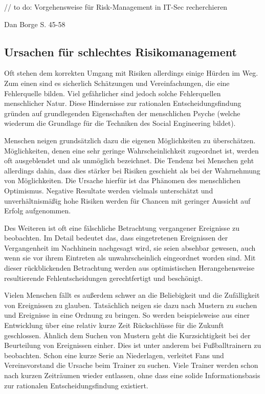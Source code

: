 // to do: Vorgehensweise für Risk-Management in IT-Sec recherchieren

Dan Borge S. 45-58

\subsection{Ursachen für schlechtes Risikomanagement}\label{sec:ursachen}
Oft stehen dem korrekten Umgang mit Risiken allerdings einige Hürden im Weg. Zum einen sind es sicherlich Schätzungen und Vereinfachungen, die eine Fehlerquelle bilden. Viel gefährlicher sind jedoch solche Fehlerquellen menschlicher Natur. Diese Hindernisse zur rationalen Entscheidungsfindung gründen auf grundlegenden Eigenschaften der menschlichen Psyche (welche wiederum die Grundlage für die Techniken des Social Engineering bildet).

Menschen neigen grundsätzlich dazu die eigenen Möglichkeiten zu überschätzen. Möglichkeiten, denen eine sehr geringe Wahrscheinlichkeit zugeordnet ist, werden oft ausgeblendet und als unmöglich bezeichnet. Die Tendenz bei Menschen geht allerdings dahin, dass dies stärker bei Risiken geschieht als bei der Wahrnehmung von Möglichkeiten. Die Ursache hierfür ist das Phänomen des menschlichen Optimismus. Negative Resultate werden vielmals unterschätzt und unverhältnismäßig hohe Risiken werden für Chancen mit geringer Aussicht auf Erfolg aufgenommen.

Des Weiteren ist oft eine fälschliche Betrachtung vergangener Ereignisse zu beobachten. Im Detail bedeutet das, dass eingetretenen Ereignissen der Vergangenheit im Nachhinein nachgesagt wird, sie seien absehbar gewesen, auch wenn sie vor ihrem Eintreten als unwahrscheinlich eingeordnet worden sind. Mit dieser rückblickenden Betrachtung werden aus optimistischen Herangehensweise resultierende Fehlentscheidungen gerechtfertigt und beschönigt.

Vielen Menschen fällt es außerdem schwer an die Beliebigkeit und die Zufälligkeit von Ereignissen zu glauben. Tatsächlich neigen sie dazu nach Mustern zu suchen und Ereignisse in eine Ordnung zu bringen. So werden beispielsweise aus einer Entwicklung über eine relativ kurze Zeit Rückschlüsse für die Zukunft geschlossen. Ähnlich dem Suchen von Mustern geht die Kurzsichtigkeit bei der Beurteilung von Ereignissen einher. Dies ist unter anderem bei Fußballtrainern zu beobachten. Schon eine kurze Serie an Niederlagen, verleitet Fans und Vereinsvorstand die Ursache beim Trainer zu suchen. Viele Trainer werden schon nach kurzen Zeiträumen wieder entlassen, ohne dass eine solide Informationsbasis zur rationalen Entscheidungsfindung existiert.

